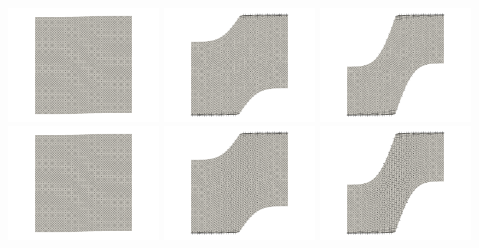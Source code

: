 \begin{center}
\includegraphics[width=4cm]{python_codes/fieldstone_89/results/shearband/old_dirs0000}
\includegraphics[width=4cm]{python_codes/fieldstone_89/results/shearband/old_dirs0005}
\includegraphics[width=4cm]{python_codes/fieldstone_89/results/shearband/old_dirs0010}\\
\includegraphics[width=4cm]{python_codes/fieldstone_89/results/shearband/new_dirs0000}
\includegraphics[width=4cm]{python_codes/fieldstone_89/results/shearband/new_dirs0005}
\includegraphics[width=4cm]{python_codes/fieldstone_89/results/shearband/new_dirs0010}\\
\end{center}


